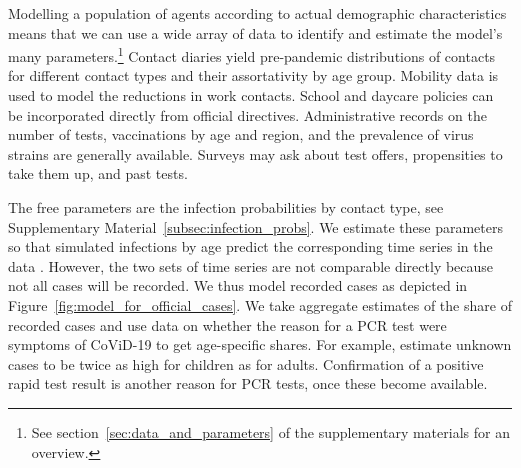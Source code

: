 Modelling a population of agents according to actual demographic characteristics means
that we can use a wide array of data to identify and estimate the model's many
parameters.\footnote{See section~\ref{sec:data_and_parameters} of the supplementary
    materials for an overview.} Contact diaries yield pre-pandemic distributions of contacts
for different contact types and their assortativity by age group. Mobility data is used
to model the reductions in work contacts. School and daycare policies can be
incorporated directly from official directives. Administrative records on the number of
tests, vaccinations by age and region, and the prevalence of virus strains are generally
available. Surveys may ask about test offers, propensities to take them up, and past
tests.

The free parameters are the infection probabilities by contact type, see Supplementary
Material~\ref{subsec:infection_probs}. We estimate these parameters so that  simulated
infections by age predict the corresponding time series in the data \citep[See][for the
general method]{McFadden1989}. However, the two sets of time series are not comparable
directly because not all cases will be recorded. We thus model recorded cases as depicted
in Figure~\ref{fig:model_for_official_cases}. We take aggregate estimates of the share of
recorded cases and use data on whether the reason for a PCR test were symptoms of
CoViD-19 to get age-specific shares. For example, estimate unknown cases to be twice as high for
children as for adults. Confirmation of a positive rapid test result is another reason
for PCR tests, once these become available.

